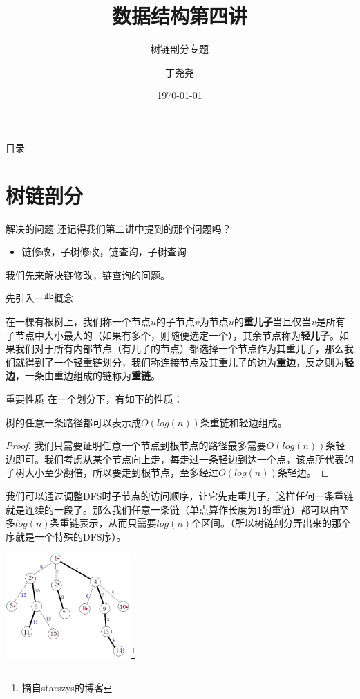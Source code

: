 \documentclass{beamer}
\title{数据结构第四讲}
\subtitle{树链剖分专题}
\author{丁尧尧}
\institute{上海交通大学}
\date{\today}
\begin{document}
	\maketitle
	\begin{frame}{目录}
		\tableofcontents
	\end{frame}
	\section{树链剖分}
		\begin{frame}{解决的问题}
			还记得我们第二讲中提到的那个问题吗？
			\begin{itemize}
				\item 链修改，子树修改，链查询，子树查询
			\end{itemize}
			我们先来解决链修改，链查询的问题。
		\end{frame}
		\begin{frame}{先引入一些概念}
			\begin{definition}
				在一棵有根树上，我们称一个节点$u$的子节点$v$为节点$u$的\textbf{重儿子}当且仅当$v$是所有子节点中大小最大的（如果有多个，则随便选定一个），其余节点称为\textbf{轻儿子}。如果我们对于所有内部节点（有儿子的节点）都选择一个节点作为其重儿子，那么我们就得到了一个轻重链划分，我们称连接节点及其重儿子的边为\textbf{重边}，反之则为\textbf{轻边}，一条由重边组成的链称为\textbf{重链}。
			\end{definition}
		\end{frame}
		\begin{frame}{重要性质}
			在一个划分下，有如下的性质：
			\begin{theorem}
				树的任意一条路径都可以表示成$O(log(n))$条重链和轻边组成。
			\end{theorem}
			\begin{proof}
				我们只需要证明任意一个节点到根节点的路径最多需要$O(log(n))$条轻边即可。我们考虑从某个节点向上走，每走过一条轻边到达一个点，该点所代表的子树大小至少翻倍，所以要走到根节点，至多经过$O(log(n))$条轻边。
			\end{proof}
		\end{frame}
		\begin{frame}
			我们可以通过调整DFS时子节点的访问顺序，让它先走重儿子，这样任何一条重链就是连续的一段了。那么我们任意一条链（单点算作长度为$1$的重链）都可以由至多$log(n)$条重链表示，从而只需要$log(n)$个区间。（所以树链剖分弄出来的那个序就是一个特殊的DFS序）。
			
			
			\includegraphics[height=4cm]{tdcp.jpeg}\footnote{摘自starszys的博客}
		\end{frame}
\end{document}
